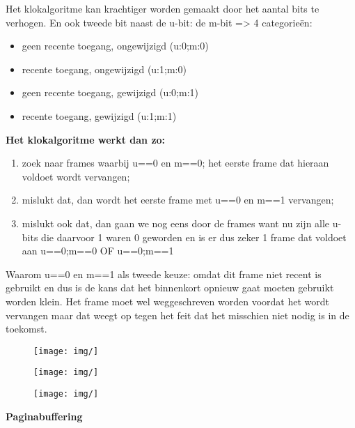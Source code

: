 Het klokalgoritme kan krachtiger worden gemaakt door het aantal bits te verhogen. En ook tweede bit naast de u-bit: de m-bit => 4 categorieën:

\begin{itemize}
\item geen recente toegang, ongewijzigd (u:0;m:0)
\item recente toegang, ongewijzigd (u:1;m:0)
\item geen recente toegang, gewijzigd (u:0;m:1)
\item recente toegang, gewijzigd (u:1;m:1)
\end{itemize}

\textbf{Het klokalgoritme werkt dan zo:}

\begin{enumerate}
\item zoek naar frames waarbij u==0 en m==0; het eerste frame dat hieraan voldoet wordt vervangen;
\item mislukt dat, dan wordt het eerste frame met u==0 en m==1 vervangen;
\item mislukt ook dat, dan gaan we nog eens door de frames want nu zijn alle u-bits die daarvoor 1 waren 0 geworden en is er dus zeker 1 frame dat voldoet aan u==0;m==0 OF u==0;m==1
\end{enumerate}

Waarom u==0 en m==1 als tweede keuze: omdat dit frame niet recent is gebruikt en dus is de kans dat het binnenkort opnieuw gaat moeten gebruikt worden klein. Het frame moet wel weggeschreven worden voordat het wordt vervangen maar dat weegt op tegen het feit dat het misschien niet nodig is in de toekomst.


\begin{figure}[htp]
    \centering
            \texttt{[image: img/]}
        \caption{}
    \label{fig:}
\end{figure}

\begin{figure}[htp]
    \centering
            \texttt{[image: img/]}
        \caption{}
    \label{fig:}
\end{figure}

\begin{figure}[htp]
    \centering
            \texttt{[image: img/]}
        \caption{}
    \label{fig:}
\end{figure}



\textbf{Paginabuffering}


